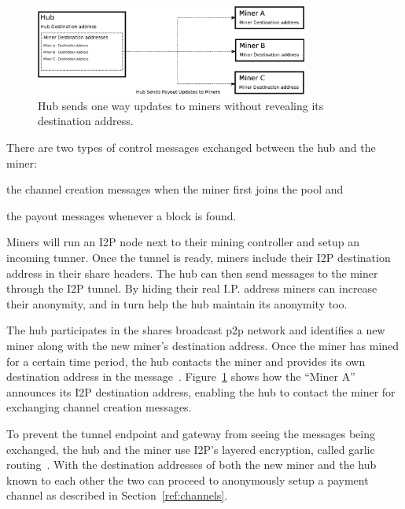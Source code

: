\documentclass{article}
\begin{document}
\begin{figure}
  \begin{center}
    \includegraphics[width=0.8\textwidth]{payout-communication.eps}
    \caption{Hub sends one way updates to miners without revealing its
      destination address.}\label{fig:new-miner-communication}
  \end{center}
\end{figure}

There are two types of control messages exchanged between the hub and
the miner: 
\begin{enumerate*}
\item the channel creation messages when the miner first joins the
  pool and
\item the payout messages whenever a block is found.
\end{enumerate*}

Miners will run an I2P node next to their mining controller and setup
an incoming tunner. Once the tunnel is ready, miners include their I2P
destination address in their share headers. The hub can then send
messages to the miner through the I2P tunnel. By hiding their real
I.P. address miners can increase their anonymity, and in turn help the
hub maintain its anonymity too.

The hub participates in the shares broadcast p2p network and
identifies a new miner along with the new miner's destination
address. Once the miner has mined for a certain time period, the hub
contacts the miner and provides its own destination address in the
message~\cite{i2p-streaming-library}. Figure~\ref{fig:new-miner-communication}
shows how the ``Miner A'' announces its I2P destination address,
enabling the hub to contact the miner for exchanging channel creation
messages.

To prevent the tunnel endpoint and gateway from seeing the messages
being exchanged, the hub and the miner use I2P's layered encryption,
called garlic routing~\cite{i2p-garlic-routing}. With the destination
addresses of both the new miner and the hub known to each other the
two can proceed to anonymously setup a payment channel as described in
Section~\ref{ref:channels}.
\end{document}
